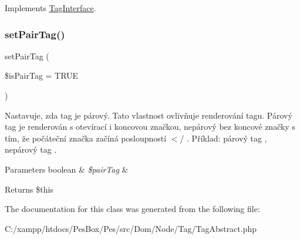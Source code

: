 Implements \mbox{\hyperlink{interface_pes_1_1_dom_1_1_node_1_1_tag_1_1_tag_interface_a8d496f376687a9da8397563a92d43918}{Tag\+Interface}}.

\mbox{\label{class_pes_1_1_dom_1_1_node_1_1_tag_1_1_tag_abstract_aa3c8cc6b22e24f476f967c86284ab79c}} 
\subsubsection{\texorpdfstring{set\+Pair\+Tag()}{setPairTag()}}
{\footnotesize\ttfamily set\+Pair\+Tag (\begin{DoxyParamCaption}\item[{}]{\$is\+Pair\+Tag = {\ttfamily TRUE} }\end{DoxyParamCaption})}

Nastavuje, zda tag je párový. Tato vlastnost ovlivňuje renderování tagu. Párový tag je renderován s otevírací i koncovou značkou, nepárový bez koncové značky s tím, že počáteční značka začíná posloupností $<$/ . Příklad\+: párový tag , nepárový tag .


\begin{DoxyParams}[1]{Parameters}
boolean & {\em \$pair\+Tag} & \\
\hline
\end{DoxyParams}
\begin{DoxyReturn}{Returns}
\$this 
\end{DoxyReturn}


The documentation for this class was generated from the following file\+:\begin{DoxyCompactItemize}
\item 
C\+:/xampp/htdocs/\+Pes\+Box/\+Pes/src/\+Dom/\+Node/\+Tag/Tag\+Abstract.\+php\end{DoxyCompactItemize}
